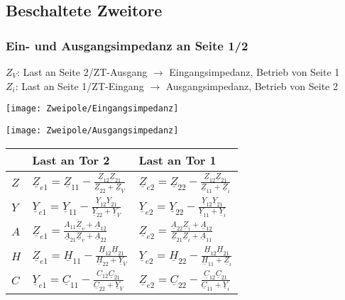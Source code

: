 \subsection{Beschaltete Zweitore}
\subsubsection{Ein- und Ausgangsimpedanz an Seite 1/2}
{\small $Z_V$: Last an Seite 2/ZT-Ausgang $\rightarrow$ Eingangsimpedanz, Betrieb von Seite 1\\ $Z_i$: Last an Seite 1/ZT-Eingang $\rightarrow$ Ausgangsimpedanz, Betrieb von Seite 2}\\
\setlength{\parindent}{0pt}
\begin{minipage}{0.5\columnwidth}
\texttt{[image: Zweipole/Eingangsimpedanz]}
\end{minipage}
\begin{minipage}{0.5\columnwidth}
	\texttt{[image: Zweipole/Ausgangsimpedanz]}
\end{minipage}

\begin{tabularx}{\columnwidth}{|X|l|l|}
	\hline  & Last an Tor 2 & Last an Tor 1 \\
	\hline$Z$ & $ \underline{Z}_{e1} =  \underline{Z}_{11}-\frac{\underline{Z}_{12} \underline{Z}_{21}}{\underline{Z}_{22}+\underline{Z}_{V}}$ & $\underline{Z}_{e 2}=\underline{Z}_{22}-\frac{\underline{Z}_{12} \underline{Z}_{21}}{\underline{Z}_{11}+\underline{Z}_{i}}$ \\
	\hline
	$Y$ & $\underline{Y}_{e 1}=\underline{Y}_{11}-\frac{\underline{Y}_{12} \underline{Y}_{21}}{\underline{Y}_{22}+\underline{Y}_{V}}$ & $\underline{Y}_{e 2}=\underline{Y}_{22}-\frac{\underline{Y}_{12} \underline{Y}_{21}}{\underline{Y}_{11}+\underline{Y}_{i}}$ \\
	\hline
	$A$ & $\underline{Z}_{e 1}=\frac{A_{11} \underline{Z}_{v}+\underline{A}_{12}}{\underline{A}_{21} \underline{Z}_{v}+\underline{A}_{22}}$ & $\underline{Z}_{e 2}=\frac{\underline{A}_{22} \underline{Z}_{i}+\underline{A}_{12}}{\underline{Z}_{21} \underline{Z}_{i}+\underline{A}_{11}}$ \\
	\hline
	$H$ & $\underline{Z}_{e 1}=\underline{H}_{11}-\frac{\underline{H}_{12} \underline{H}_{21}}{\underline{H}_{22}+\underline{Y}_{V}}$ & $\underline{Y}_{e 2}=\underline{H}_{22}-\frac{\underline{H}_{12} \underline{H}_{21}}{\underline{H}_{11}+\underline{Z}_{i}}$ \\
	\hline
	$C$ & $\underline{Y}_{e1}=\underline{C}_{11}-\frac{C_{12} \underline{C}_{21}}{\underline{C}_{22}+\underline{Y}_{V}}$ & $\underline{Z}_{e 2}=\underline{C}_{22}-\frac{\underline{C}_{12} \underline{C}_{21}}{\underline{C}_{11}+\underline{Y}_{i}}$ \\
	\hline
\end{tabularx}

